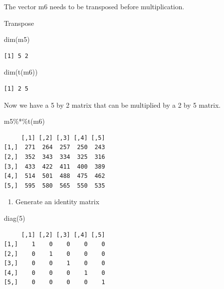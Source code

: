 \documentclass[
  letterpaper,
  DIV=11,
  numbers=noendperiod]{scrreprt}
\newenvironment{Shaded}{\begin{snugshade}}{\end{snugshade}}
\newcommand{\DecValTok}[1]{\textcolor[rgb]{0.68,0.00,0.00}{#1}}
\newcommand{\FunctionTok}[1]{\textcolor[rgb]{0.28,0.35,0.67}{#1}}
\newcommand{\NormalTok}[1]{\textcolor[rgb]{0.00,0.23,0.31}{#1}}
\newcommand{\SpecialCharTok}[1]{\textcolor[rgb]{0.37,0.37,0.37}{#1}}
\providecommand{\tightlist}{%
  \setlength{\itemsep}{0pt}\setlength{\parskip}{0pt}}\usepackage{longtable,booktabs,array}
\begin{document}
The vector m6 needs to be transposed before multiplication.

Transpose

\begin{Shaded}
\begin{Highlighting}[]
\FunctionTok{dim}\NormalTok{(m5)}
\end{Highlighting}
\end{Shaded}

\begin{verbatim}
[1] 5 2
\end{verbatim}

\begin{Shaded}
\begin{Highlighting}[]
\FunctionTok{dim}\NormalTok{(}\FunctionTok{t}\NormalTok{(m6))}
\end{Highlighting}
\end{Shaded}

\begin{verbatim}
[1] 2 5
\end{verbatim}

Now we have a 5 by 2 matrix that can be multiplied by a 2 by 5 matrix.

\begin{Shaded}
\begin{Highlighting}[]
\NormalTok{m5}\SpecialCharTok{\%*\%}\FunctionTok{t}\NormalTok{(m6)}
\end{Highlighting}
\end{Shaded}

\begin{verbatim}
     [,1] [,2] [,3] [,4] [,5]
[1,]  271  264  257  250  243
[2,]  352  343  334  325  316
[3,]  433  422  411  400  389
[4,]  514  501  488  475  462
[5,]  595  580  565  550  535
\end{verbatim}

\begin{enumerate}
\def\labelenumi{\alph{enumi}.}
\setcounter{enumi}{4}
\tightlist
\item
  Generate an identity matrix
\end{enumerate}

\begin{Shaded}
\begin{Highlighting}[]
\FunctionTok{diag}\NormalTok{(}\DecValTok{5}\NormalTok{)}
\end{Highlighting}
\end{Shaded}

\begin{verbatim}
     [,1] [,2] [,3] [,4] [,5]
[1,]    1    0    0    0    0
[2,]    0    1    0    0    0
[3,]    0    0    1    0    0
[4,]    0    0    0    1    0
[5,]    0    0    0    0    1
\end{verbatim}
\end{document}
